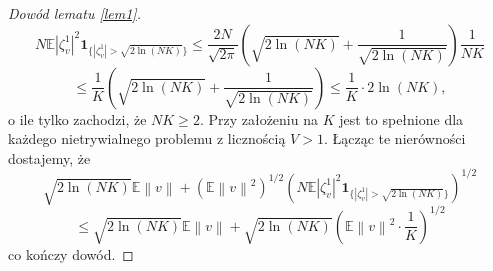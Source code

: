 \documentclass[man,mfiu]{mgrwms}
\newcommand{\norm}[1]{\left\lVert#1\right\rVert}
\begin{document}
\begin{proof} [Dowód lematu \ref{lem1}]
\begin{displaymath}
N\mathbb{E}|\zeta_v^1|^2\pmb{1}_{\{|\zeta_v^1|> \sqrt{2\ln (NK)}\}}\leq \frac{2N}{\sqrt{2\pi}}\left(\sqrt{2\ln (NK)}+\frac{1}{\sqrt{2\ln (NK)}}\right)\frac{1}{NK}
\end{displaymath}
\begin{displaymath}
\leq  \frac{1}{K}\left(\sqrt{2\ln (NK)}+\frac{1}{\sqrt{2\ln (NK)}}\right)\leq  \frac{1}{K}\cdot 2\ln (NK),
\end{displaymath}
o ile tylko zachodzi, że $NK\geq 2$. Przy założeniu na $K$ jest to spełnione dla każdego nietrywialnego problemu z licznością $V>1$. Łącząc te nierówności dostajemy, że
\begin{displaymath}
\sqrt{2\ln (NK)}\mathbb{E}\norm{v}+\left(\mathbb{E}\norm{v}^2\right)^{1/2}\left(N\mathbb{E}|\zeta_v^1|^2\pmb{1}_{\{|\zeta_v^1|> \sqrt{2\ln (NK)}\}}\right)^{1/2}
\end{displaymath}
\begin{displaymath}
\leq \sqrt{2\ln (NK)}\mathbb{E}\norm{v}+\sqrt{2\ln (NK)}\left(\mathbb{E}\norm{v}^2\cdot \frac{1}{K}\right)^{1/2}
\end{displaymath}
co kończy dowód.
\end{proof}
\end{document}
